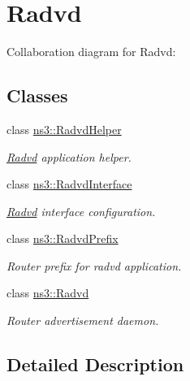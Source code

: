 \hypertarget{group__radvd}{}\section{Radvd}
\label{group__radvd}
Collaboration diagram for Radvd\+:
\subsection*{Classes}
\begin{DoxyCompactItemize}
\item 
class \hyperlink{classns3_1_1RadvdHelper}{ns3\+::\+Radvd\+Helper}
\begin{DoxyCompactList}\small\item\em \hyperlink{classns3_1_1Radvd}{Radvd} application helper. \end{DoxyCompactList}\item 
class \hyperlink{classns3_1_1RadvdInterface}{ns3\+::\+Radvd\+Interface}
\begin{DoxyCompactList}\small\item\em \hyperlink{classns3_1_1Radvd}{Radvd} interface configuration. \end{DoxyCompactList}\item 
class \hyperlink{classns3_1_1RadvdPrefix}{ns3\+::\+Radvd\+Prefix}
\begin{DoxyCompactList}\small\item\em Router prefix for radvd application. \end{DoxyCompactList}\item 
class \hyperlink{classns3_1_1Radvd}{ns3\+::\+Radvd}
\begin{DoxyCompactList}\small\item\em Router advertisement daemon. \end{DoxyCompactList}\end{DoxyCompactItemize}


\subsection{Detailed Description}
